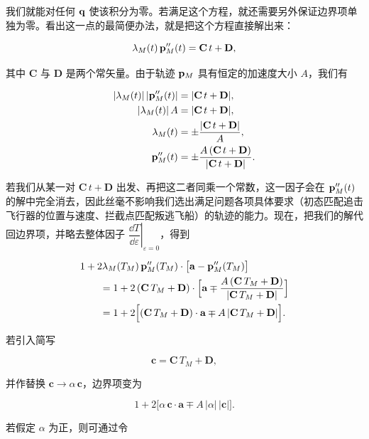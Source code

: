 我们就能对任何 $\mathbf{q}$ 使该积分为零。若满足这个方程，就还需要另外保证边界项单独为零。看出这一点的最简便办法，就是把这个方程直接解出来：

\begin{equation}
\lambda_M(t)\,\mathbf{p}_M''(t)=\mathbf{C}\,t+\mathbf{D},
\end{equation}

其中 $\mathbf{C}$ 与 $\mathbf{D}$ 是两个常矢量。由于轨迹 $\mathbf{p}_M$ 具有恒定的加速度大小 $A$，我们有

\begin{align}
|\lambda_M(t)|\,|\mathbf{p}_M''(t)| &= |\mathbf{C}\,t+\mathbf{D}|, \\
|\lambda_M(t)|\,A &= |\mathbf{C}\,t+\mathbf{D}|, \\
\lambda_M(t) &= \pm\frac{|\mathbf{C}\,t+\mathbf{D}|}{A}, \\
\mathbf{p}_M''(t) &= \pm\frac{A\,(\mathbf{C}\,t+\mathbf{D})}{|\mathbf{C}\,t+\mathbf{D}|}.
\end{align}

若我们从某一对 $\mathbf{C}\,t+\mathbf{D}$ 出发、再把这二者同乘一个常数，这一因子会在 $\mathbf{p}_M''(t)$ 的解中完全消去，因此丝毫不影响我们选出满足问题各项具体要求（初态匹配追击飞行器的位置与速度、拦截点匹配叛逃飞船）的轨迹的能力。现在，把我们的解代回边界项，并略去整体因子 $\left.\dfrac{\dd T}{\dd\varepsilon}\right|_{\varepsilon=0}$，得到

\begin{align}
&1+2\lambda_M(T_M)\,\mathbf{p}_M''(T_M)\cdot\bigl[\mathbf{a}-\mathbf{p}_M''(T_M)\bigr] \nonumber\\
&\qquad = 1+2\,(\mathbf{C}\,T_M+\mathbf{D})\cdot\Bigl[\mathbf{a}\mp\frac{A\,(\mathbf{C}\,T_M+\mathbf{D})}{|\mathbf{C}\,T_M+\mathbf{D}|}\Bigr] \nonumber\\
&\qquad = 1+2\Bigl[(\mathbf{C}\,T_M+\mathbf{D})\cdot\mathbf{a}\mp A\,|\mathbf{C}\,T_M+\mathbf{D}|\Bigr].
\end{align}

若引入简写

\begin{equation}
\mathbf{c}=\mathbf{C}\,T_M+\mathbf{D},
\end{equation}

并作替换 $\mathbf{c}\to\alpha\,\mathbf{c}$，边界项变为

\begin{equation}
1+2\bigl[\alpha\,\mathbf{c}\cdot\mathbf{a}\mp A\,|\alpha|\,|\mathbf{c}|\bigr].
\end{equation}

若假定 $\alpha$ 为正，则可通过令

